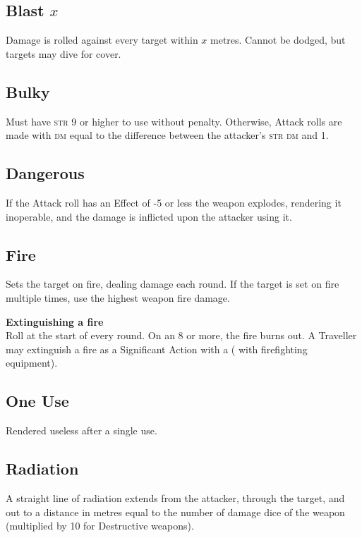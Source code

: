\documentclass{cheatsheet}
\begin{document}
\begin{multicols}{3}
\subsection{Blast $x$}

Damage is rolled against every target within $x$ metres.  Cannot be
dodged, but targets may dive for cover.

\subsection{Bulky}

Must have \textsc{str} 9 or higher to use without penalty.  Otherwise,
Attack rolls are made with \textsc{dm} equal to the difference between
the attacker's \textsc{str dm} and 1.

\subsection{Dangerous}

If the Attack roll has an Effect of -5 or less the weapon explodes,
rendering it inoperable, and the damage is inflicted upon the attacker
using it.

\subsection{Fire}

Sets the target on fire, dealing damage each round.  If the target is
set on fire multiple times, use the highest weapon fire damage.

\textbf{Extinguishing a fire}\\
Roll  at the start of every round.  On an 8 or more, the fire
burns out.  A Traveller may extinguish a fire as a Significant Action
with a  ( with firefighting equipment).

\subsection{One Use}

Rendered useless after a single use.

\subsection{Radiation}

A straight line of radiation extends from the attacker, through the
target, and out to a distance in metres equal to the number of damage
dice of the weapon (multiplied by 10 for Destructive weapons).


\end{multicols}
\end{document}
